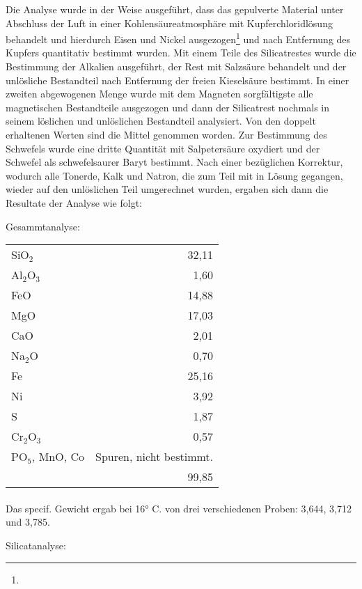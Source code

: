 \documentclass[a4paper, 11pt, oneside]{article}
\begin{document}
Die Analyse wurde in der Weise ausgeführt, dass das gepulverte Material unter Abschluss der Luft in einer Kohlensäureatmosphäre mit Kupferchloridlösung behandelt und hierdurch Eisen und Nickel ausgezogen\footnote{} und nach Entfernung des Kupfers quantitativ bestimmt wurden. Mit einem Teile des Silicatrestes wurde die Bestimmung der Alkalien ausgeführt, der Rest mit Salzsäure behandelt und der unlösliche Bestandteil nach Entfernung der freien Kieselsäure bestimmt. In einer zweiten abgewogenen Menge wurde mit dem Magneten sorgfältigste alle magnetischen Bestandteile ausgezogen und dann der Silicatrest nochmals in seinem löslichen und unlöslichen Bestandteil analysiert. Von den doppelt erhaltenen Werten sind die Mittel genommen worden. Zur Bestimmung des Schwefels wurde eine dritte Quantität mit Salpetersäure oxydiert und der Schwefel als schwefelsaurer Baryt bestimmt. Nach einer bezüglichen Korrektur, wodurch alle Tonerde, Kalk und Natron, die zum Teil mit in Lösung gegangen, wieder auf den unlöslichen Teil umgerechnet wurden, ergaben sich dann die Resultate der Analyse wie folgt:
\begin{center}
Gesammtanalyse:
\end{center}
\normalsize
\begin{center}
\begin{tabular}{ l r }
    SiO$_{2}$ & 32,11\\
    Al$_{2}$O$_{3}$ & 1,60\\
    FeO & 14,88\\
    MgO & 17,03\\
    CaO & 2,01\\
    Na$_{2}$O & 0,70\\
    Fe & 25,16\\
    Ni & 3,92\\
    S & 1,87\\
    Cr$_{2}$O$_{3}$ & 0,57\\
    PO$_{5}$, MnO, Co & Spuren, nicht bestimmt.\\
     & 99,85
\end{tabular}
\end{center}
\LARGE
\paragraph{}
Das specif. Gewicht ergab bei 16° C. von drei verschiedenen Proben: 3,644, 3,712 und 3,785.
\begin{center}
Silicatanalyse:
\end{center}
\large
\end{document}

